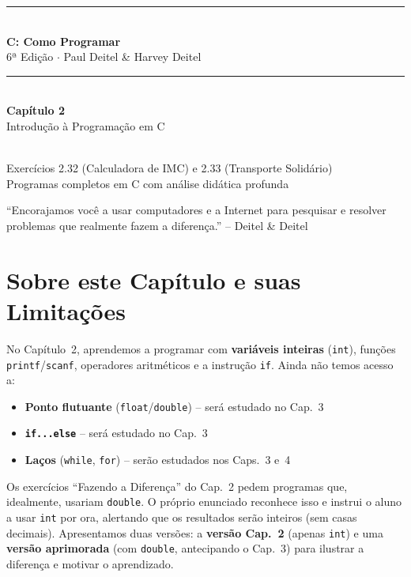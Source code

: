 \documentclass[12pt,a4paper]{article}
\begin{document}
\begin{titlepage}
  \centering\vspace*{2cm}
  {\color{deitelblue}\rule{\linewidth}{2pt}}\\[0.4cm]
  {\huge\bfseries\color{deitelblue}C: Como Programar}\\[0.2cm]
  {\large\color{deitelblue}6ª Edição $\cdot$ Paul Deitel \& Harvey Deitel}\\[0.2cm]
  {\color{deitelblue}\rule{\linewidth}{2pt}}\\[1cm]
  {\LARGE\bfseries Capítulo 2}\\[0.3cm]
  {\Large\color{deitelblue!80}Introdução à Programação em C}\\[0.8cm]
  \begin{tcolorbox}[colback=ecolightgreen,colframe=ecogreen,width=0.85\linewidth]
    \\[0.3cm]
    {\normalsize Exercícios 2.32 (Calculadora de IMC) e 2.33 (Transporte Solidário)\\[0.2cm]
    Programas completos em C com análise didática profunda}
  \end{tcolorbox}
  \vfill{\small\color{deitelblue}``Encorajamos você a usar computadores e a Internet para
  pesquisar e resolver problemas que realmente fazem a diferença.'' -- Deitel \& Deitel}
\end{titlepage}

\tableofcontents\newpage

\section*{Sobre este Capítulo e suas Limitações}

No Capítulo~2, aprendemos a programar com \textbf{variáveis inteiras} (\texttt{int}),
funções \texttt{printf}/\texttt{scanf}, operadores aritméticos e a instrução \texttt{if}.
Ainda não temos acesso a:
\begin{itemize}
  \item \textbf{Ponto flutuante} (\texttt{float}/\texttt{double}) -- será estudado no Cap.~3
  \item \textbf{\texttt{if...else}} -- será estudado no Cap.~3
  \item \textbf{Laços} (\texttt{while}, \texttt{for}) -- serão estudados nos Caps.~3 e~4
\end{itemize}

\begin{atencao}
  Os exercícios ``Fazendo a Diferença'' do Cap.~2 pedem programas que,
  idealmente, usariam \texttt{double}. O próprio enunciado reconhece isso e
  instrui o aluno a usar \texttt{int} por ora, alertando que os resultados
  serão inteiros (sem casas decimais). Apresentamos duas versões:
  a \textbf{versão Cap.~2} (apenas \texttt{int}) e uma
  \textbf{versão aprimorada} (com \texttt{double}, antecipando o Cap.~3)
  para ilustrar a diferença e motivar o aprendizado.
\end{atencao}
\end{document}
